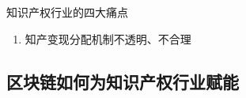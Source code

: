 \documentclass[11pt]{beamer}
\begin{document}
\begin{frame}{知识产权行业的四大痛点}
\begin{enumerate}
		\item 知产变现分配机制不透明、不合理
	\end{enumerate}
\end{frame}

\subsection{区块链如何为知识产权行业赋能}
\end{document}
